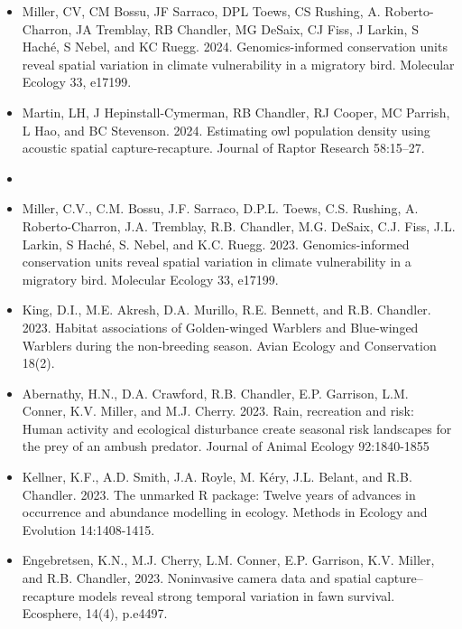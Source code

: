 \documentclass[12pt]{article}
\begin{document}
\begin{itemize}
\item Miller, CV, CM Bossu, JF Sarraco, DPL Toews, CS Rushing,
  A. Roberto-Charron, JA Tremblay, RB Chandler, MG DeSaix, CJ Fiss, J
  Larkin, S Hach\'e, S Nebel, and KC Ruegg. 2024. Genomics-informed
  conservation units reveal spatial variation in climate vulnerability
  in a migratory bird. Molecular Ecology 33, e17199.

\item Martin, LH, J Hepinstall-Cymerman, RB Chandler, RJ Cooper, MC
  Parrish, L Hao, and BC Stevenson. 2024. Estimating owl population
  density using acoustic spatial capture-recapture. Journal of Raptor
  Research 58:15--27. 


\item[] { \\}

\item Miller, C.V., C.M. Bossu, J.F. Sarraco, D.P.L. Toews,
  C.S. Rushing, A. Roberto-Charron, J.A. Tremblay, R.B. Chandler,
  M.G. DeSaix, C.J. Fiss, J.L. Larkin, S Hach\'{e}, S. Nebel, and
  K.C. Ruegg. 2023. Genomics-informed conservation units reveal
  spatial variation in climate vulnerability in a migratory
  bird. Molecular Ecology 33, e17199.

\item King, D.I., M.E. Akresh, D.A. Murillo, R.E. Bennett, and R.B.
  Chandler. 2023. Habitat associations of Golden-winged Warblers and
  Blue-winged Warblers during the non-breeding season. Avian Ecology
  and Conservation 18(2).  

\item Abernathy, H.N., D.A. Crawford, R.B. Chandler, E.P. Garrison,
  L.M. Conner, K.V. Miller, and M.J. Cherry. 2023. Rain, recreation
  and risk: Human activity and ecological disturbance create seasonal
  risk landscapes for the prey of an ambush predator. Journal of
  Animal Ecology 92:1840-1855
  
\item Kellner, K.F., A.D. Smith, J.A. Royle, M. K\'ery, J.L. Belant,
  and R.B. Chandler. 2023. The unmarked R package: Twelve years of
  advances in occurrence and abundance modelling in ecology. Methods
  in Ecology and Evolution 14:1408-1415. 
  
\item Engebretsen, K.N., M.J. Cherry, L.M. Conner, E.P. Garrison,
  K.V. Miller, and R.B. Chandler, 2023. Noninvasive camera data and
  spatial capture–recapture models reveal strong temporal variation in
  fawn survival. Ecosphere, 14(4), p.e4497. 


\end{itemize}
\end{document}
